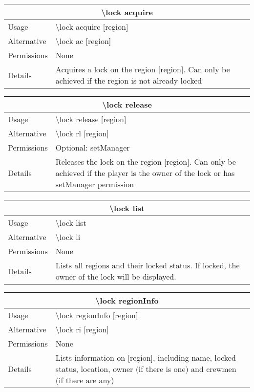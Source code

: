 \documentclass[a4paper,twoside,notitlepage,11pt]{article}
\begin{document}
\begin{center}
\begin{tabular}{|p{2cm}|p{12.5cm}|} \hline
\multicolumn{2}{|c|}{\textbf{\textbackslash lock acquire}} \\ \hline
Usage       & \textbackslash lock acquire [region] \\ \hline
Alternative & \textbackslash lock ac [region] \\ \hline
Permissions & None \\ \hline
Details 	& Acquires a lock on the region [region]. Can only be achieved if the region is not already locked \\ \hline
\end{tabular}
\end{center}

\begin{center}
\begin{tabular}{|p{2cm}|p{12.5cm}|} \hline
\multicolumn{2}{|c|}{\textbf{\textbackslash lock release}} \\ \hline
Usage       & \textbackslash lock release [region] \\ \hline
Alternative & \textbackslash lock rl [region] \\ \hline
Permissions & Optional: setManager \\ \hline
Details 	& Releases the lock on the region [region]. Can only be achieved if the player is the owner of the lock or has setManager permission \\ \hline
\end{tabular}
\end{center}

\begin{center}
\begin{tabular}{|p{2cm}|p{12.5cm}|} \hline
\multicolumn{2}{|c|}{\textbf{\textbackslash lock list}} \\ \hline
Usage       & \textbackslash lock list \\ \hline
Alternative & \textbackslash lock li \\ \hline
Permissions & None \\ \hline
Details 	& Lists all regions and their locked status. If locked, the owner of the lock will be displayed. \\ \hline
\end{tabular}
\end{center}

\newpage
\pagestyle{plain}
\begin{center}
\begin{tabular}{|p{2cm}|p{12.5cm}|} \hline
\multicolumn{2}{|c|}{\textbf{\textbackslash lock regionInfo}} \\ \hline
Usage       & \textbackslash lock regionInfo [region] \\ \hline
Alternative & \textbackslash lock ri [region] \\ \hline
Permissions & None \\ \hline
Details 	& Lists information on [region], including name, locked status, location, owner (if there is one) and crewmen (if there are any) \\ \hline
\end{tabular}
\end{center}
\end{document}
